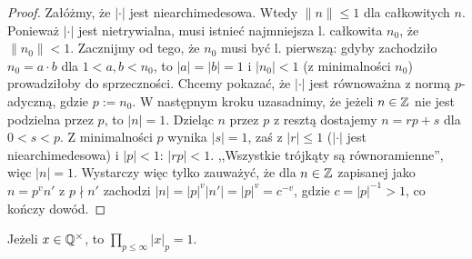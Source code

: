 \begin{proof}
	Załóżmy, że $|\cdot|$ jest niearchimedesowa.
	Wtedy $\|n\| \le 1$ dla całkowitych $n$.
	Ponieważ $|\cdot|$ jest nietrywialna, musi istnieć najmniejsza l. całkowita $n_0$, że $\|n_0\| < 1$.
	Zacznijmy od tego, że $n_0$ musi być l. pierwszą: gdyby zachodziło $n_0 = a \cdot b$ dla $1 < a,b < n_0$, to $|a| = |b| = 1$ i $|n_0| < 1$ (z minimalności $n_0$) prowadziłoby do sprzeczności.
	Chcemy pokazać, że $|\cdot|$ jest równoważna z normą $p$-adyczną, gdzie $p := n_0$.
	W następnym kroku uzasadnimy, że jeżeli $n \in \mathbb{Z}$ nie jest podzielna przez $p$, to $|n| = 1$.
	Dzieląc $n$ przez $p$ z resztą dostajemy $n = rp + s$ dla $0 < s < p$.
	Z minimalności $p$ wynika $|s| = 1$, zaś z $|r| \le 1$ ($|\cdot|$ jest niearchimedesowa) i $|p| < 1$: $|rp| < 1$.
	,,Wszystkie trójkąty są równoramienne'', więc $|n| = 1$.
	Wystarczy więc tylko zauważyć, że dla $n \in \mathbb{Z}$ zapisanej jako $n = p^v n'$ z $p \nmid n'$ zachodzi $|n| = |p|^v |n'| = |p|^v = c^{-v}$, gdzie $c = |p|^{-1} > 1$, co kończy dowód.
\end{proof}

\begin{fakt}
	Jeżeli $x \in \mathbb{Q}^\times$, to $\prod_{p \le \infty} |x|_p = 1$.
\end{fakt}